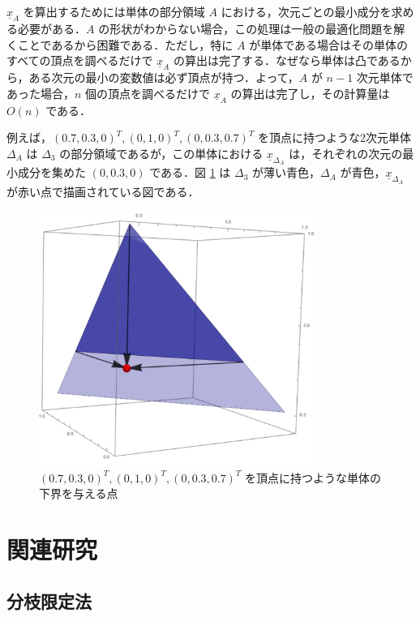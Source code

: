 \documentclass[a4paper,11pt]{jreport}
\begin{document}
$ \underline{x}_A $ を算出するためには単体の部分領域 $ A $ における，次元ごとの最小成分を求める必要がある．$ A $ の形状がわからない場合，この処理は一般の最適化問題を解くことであるから困難である．ただし，特に $ A $ が単体である場合はその単体のすべての頂点を調べるだけで $ \underline{x}_A $ の算出は完了する．なぜなら単体は凸であるから，ある次元の最小の変数値は必ず頂点が持つ．よって，$ A $ が $ n - 1 $ 次元単体であった場合，$ n $ 個の頂点を調べるだけで $ \underline{x}_A $ の算出は完了し，その計算量は $ O(n) $ である． \par
例えば，$ (0.7, 0.3, 0)^T, (0, 1, 0)^T, (0, 0.3, 0.7)^T $ を頂点に持つような2次元単体 $ \Delta_A $ は $ \Delta_3 $ の部分領域であるが，この単体における $ \underline{x}_{\Delta_A} $ は，それぞれの次元の最小成分を集めた $ (0, 0.3, 0) $ である．図 \ref{fig:lower_bound_of_simplex} は $ \Delta_3 $ が薄い青色，$ \Delta_A $ が青色，$ \underline{x}_{\Delta_A} $ が赤い点で描画されている図である．\par

\begin{figure}
\begin{center}
\includegraphics[width=9cm]{graphs/lower_bound_of_simplex.pdf}
\caption{$ (0.7, 0.3, 0)^T, (0, 1, 0)^T, (0, 0.3, 0.7)^T $ を頂点に持つような単体の下界を与える点}
\label{fig:lower_bound_of_simplex}
\end{center}
\end{figure}

\chapter{関連研究}

\section{分枝限定法} \label{sec:bnb}
\end{document}
